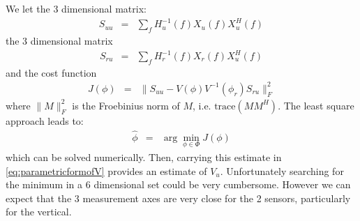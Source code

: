 \documentclass[a4paper, 12pt]{report}
\newcommand{\trace}[1]{\mathrm{trace}\left( #1 \right)}
\begin{document}
We let the 3 dimensional matrix:
\begin{eqnarray*}
S_{uu}&=&\sum_{f} H_{u}^{-1}(f)X_{u}(f)X_{u}^{H}(f)
\end{eqnarray*}
the 3 dimensional matrix
\begin{eqnarray*}
S_{ru}&=&\sum_{f} H_{r}^{-1}(f)X_{r}(f)X_{u}^{H}(f)
\end{eqnarray*}
and the cost function
\begin{eqnarray*}
J(\phi) &=&  \|S_{uu} - V(\phi)V^{-1}(\phi_{r})S_{ru}\|_{F}^{2}
\end{eqnarray*}
where $\|M\|^{2}_{F}$ is the Froebinius norm of $M$, i.e. $\trace{MM^{H}}$. The least square approach leads to:
\begin{eqnarray*}
\hat \phi &=& \arg\min_{\phi\in\Phi} J(\phi)
\end{eqnarray*}
which can be solved numerically.
Then, carrying this estimate in \eqref{eq:parametricformofV} provides an estimate of $V_{u}$. Unfortunately searching for the minimum in a 6 dimensional set could be very cumbersome. However we can expect that the 3 measurement axes  are very close for the 2 sensors, particularly for the vertical.
\end{document}
